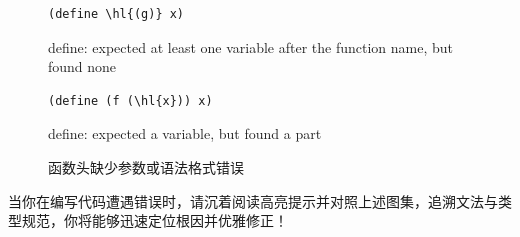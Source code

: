 \begin{figure}[htbp]
  \centering
\begin{stepperbox}[unbreakable]
\noindent\begin{minipage}[c]{0.46\linewidth}
\begin{Verbatim}[commandchars=\\\{\}, fontsize=\footnotesize]
(define \hl{(g)} x)
\end{Verbatim}
\end{minipage}\hfill
\begin{minipage}[c]{0.50\linewidth}\footnotesize\sffamily\raggedright
define: expected at least one variable after the function name, but found none
\end{minipage}
\end{stepperbox}
\begin{stepperbox}[unbreakable]
\noindent\begin{minipage}[c]{0.46\linewidth}
\begin{Verbatim}[commandchars=\\\{\}, fontsize=\footnotesize]
(define (f (\hl{x})) x)
\end{Verbatim}
\end{minipage}\hfill
\begin{minipage}[c]{0.50\linewidth}\footnotesize\sffamily\raggedright
define: expected a variable, but found a part
\end{minipage}
\end{stepperbox}
  \caption{函数头缺少参数或语法格式错误}
  \label{fig:err_redefinition}
\end{figure}

当你在编写代码遭遇错误时，请沉着阅读高亮提示并对照上述图集，追溯文法与类型规范，你将能够迅速定位根因并优雅修正！
